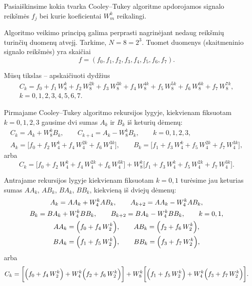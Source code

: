 \documentclass[a4paper,12pt]{article}
\begin{document}
Pasiaiškinsime kokia tvarka Cooley--Tukey algoritme apdorojamos signalo reikšmės $f_j$ bei kurie koeficientai $W_m^{k}$ reikalingi.

Algoritmo veikimo principą galima perprasti nagrinėjant nedaug reikšmių turinčių duomenų atvejį.
Tarkime, $N=8=2^3$. Tuomet duomenys (skaitmeninio signalo reikšmės) yra skaičiai
\[
    f = \left( f_0, f_1, f_2, f_3, f_4, f_5, f_6, f_7 \right).
\]

Mūsų tikslas -- apskaičiuoti dydžius
\begin{gather*}
    C_k = f_0  +  f_1\, W_8^{k}  +  f_2\, W_8^{2k}  +  f_3\, W_8^{3k}  +  f_4\, W_8^{4k}  +  f_5\, W_8^{5k}  +  f_6\, W_8^{6k}  +  f_7\, W_8^{7k}, \\
    k = 0, 1, 2, 3, 4, 5, 6, 7.
\end{gather*}

\noindent\hrulefill

\bigskip
Pirmajame Cooley--Tukey algoritmo rekursijos lygyje, kiekvienam fiksuotam $k=0,1,2,3$ gausime dvi sumas $A_k$ ir $B_k$ iš keturių dėmenų:
\begin{gather*}
    C_k = A_k + W_8^k B_k, \qquad C_{k+4} = A_k - W_8^k B_k, \qquad k = 0, 1, 2, 3,\\
    A_k = \biggl[ f_0  +  f_2\, W_4^{k}  +  f_4\, W_4^{2k}  +  f_6\, W_4^{3k} \biggr], \qquad
    B_k = \biggl[ f_1  +  f_3\, W_4^{k}  +  f_5\, W_4^{2k}  +  f_7\, W_4^{3k} \biggr],
\end{gather*}
arba
\[
    C_k =
    \biggl[ f_0  +  f_2\, W_4^{k}  +  f_4\, W_4^{2k}  +  f_6\, W_4^{3k} \biggr]  +  W_8^k
    \biggl[ f_1  +  f_3\, W_4^{k}  +  f_5\, W_4^{2k}  +  f_7\, W_4^{3k} \biggr].
\]

\noindent\hrulefill

\bigskip
Antrajame rekursijos lygyje kiekvienam fiksuotam $k=0,1$ turėsime jau keturias sumas $AA_k$, $AB_k$, $BA_k$, $BB_k$, kiekvieną iš dviejų dėmenų:
\begin{gather*}
    A_k = AA_k + W_4^k AB_k, \qquad A_{k+2} = AA_k - W_4^k AB_k,\\
    B_k = BA_k + W_4^k BB_k, \qquad B_{k+2} = BA_k - W_4^k BB_k, \qquad k = 0, 1,\\
    AA_k = \Bigl( f_0  +  f_4\, W_2^{k} \Bigr), \qquad
    AB_k = \Bigl( f_2  +  f_6\, W_2^{k} \Bigr),\\
    BA_k = \Bigl( f_1  +  f_5\, W_2^{k} \Bigr), \qquad
    BB_k = \Bigl( f_3  +  f_7\, W_2^{k} \Bigr),
\end{gather*}
arba
\[
    C_k =
    \biggl[  \Bigl( f_0  +  f_4\, W_2^{k} \Bigr)  +  W_4^{k} \Bigl( f_2  +  f_6\, W_2^{k} \Bigr) \biggr]  +  W_8^k
    \biggl[ \Bigl( f_1  +  f_5\, W_2^{k} \Bigr)  +  W_4^{k} \Bigl( f_3  +  f_7\, W_2^{k} \Bigr) \biggr].
\]
\noindent\hrulefill
\end{document}
